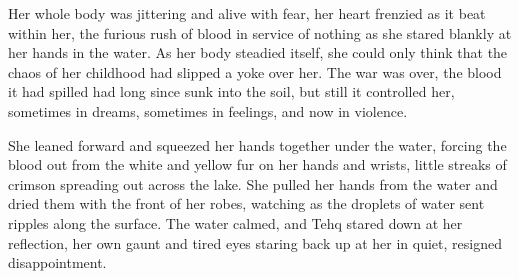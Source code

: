 Her whole body was jittering and alive with fear, her heart frenzied as it beat within her, the furious rush of blood in service of nothing as she stared blankly at her hands in the water. As her body steadied itself, she could only think that the chaos of her childhood had slipped a yoke over her. The war was over, the blood it had spilled had long since sunk into the soil, but still it controlled her, sometimes in dreams, sometimes in feelings, and now in violence.

She leaned forward and squeezed her hands together under the water, forcing the blood out from the white and yellow fur on her hands and wrists, little streaks of crimson spreading out across the lake. She pulled her hands from the water and dried them with the front of her robes, watching as the droplets of water sent ripples along the surface. The water calmed, and Tehq stared down at her reflection, her own gaunt and tired eyes staring back up at her in quiet, resigned disappointment.
